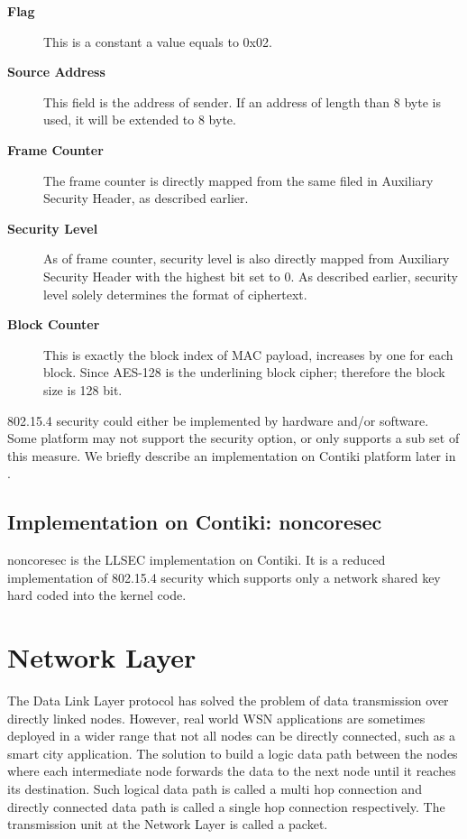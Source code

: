 \begin{description}
\item[\textbf{Flag}]
This is a constant a value equals to 0x02.
\item[\textbf{Source Address}]
This field is the address of sender. If an address of length than 8 byte is used, it will be extended to 8 byte.
\item[\textbf{Frame Counter}]
The frame counter is directly mapped from the same filed in Auxiliary Security Header, as described earlier.
\item[\textbf{Security Level}]
As of frame counter, security level is also directly mapped from Auxiliary Security Header with the highest bit set to $0$. As described earlier, security level solely determines the format of ciphertext.
\item[\textbf{Block Counter}]
This is exactly the block index of MAC payload, increases by one for each block. Since AES-128 is the underlining block cipher; therefore the block size is 128 bit.
\end{description}

802.15.4 security could either be implemented by hardware and/or software. Some platform may not support the security option, or only supports a sub set of this measure. We briefly describe an implementation on Contiki platform later in .

\subsection{Implementation on Contiki: noncoresec} \label{Subsec: noncoresec}
noncoresec is the LLSEC implementation on Contiki. It is a reduced implementation of 802.15.4 security which supports only a network shared key hard coded into the kernel code.

\section{Network Layer}
The Data Link Layer protocol has solved the problem of data transmission over directly linked nodes. However, real world WSN applications are sometimes deployed in a wider range that not all nodes can be directly connected, such as a smart city application. The solution to build a logic data path between the nodes where each intermediate node forwards the data to the next node until it reaches its destination. Such logical data path is called a multi hop connection and directly connected data path is called a single hop connection respectively. The transmission unit at the Network Layer is called a packet.


